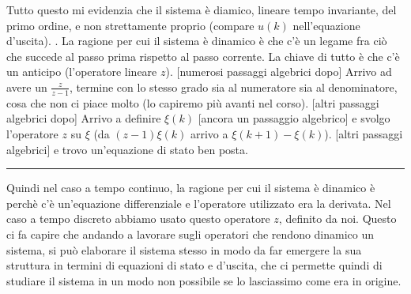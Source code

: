 Tutto questo mi evidenzia che il sistema è diamico, lineare tempo invariante, del primo ordine, e non strettamente proprio (compare $u(k)$ nell'equazione d'uscita).\newline
{}.\newline
\newline
La ragione per cui il sistema è dinamico è che c'è un legame fra ciò che succede al passo prima rispetto al passo corrente. La chiave di tutto è che c'è un anticipo (l'operatore lineare $z$). [numerosi passaggi algebrici dopo] Arrivo ad avere un $\frac{z}{z-1}$, termine con lo stesso grado sia al numeratore sia al denominatore, cosa che non ci piace molto (lo capiremo più avanti nel corso). [altri passaggi algebrici dopo] Arrivo a definire $\xi(k)$ [ancora un passaggio algebrico] e svolgo l'operatore $z$ su $\xi$ (da $(z-1)\xi(k)$ arrivo a $\xi(k+1) - \xi(k)$). [altri passaggi algebrici] e trovo un'equazione di stato ben posta.\newline
\rule{\textwidth}{0,4pt}\newline
\newline
Quindi nel caso a tempo continuo, la ragione per cui il sistema è dinamico è perchè c'è un'equazione differenziale e l'operatore utilizzato era la derivata. Nel caso a tempo discreto abbiamo usato questo operatore $z$, definito da noi.\newline
Questo ci fa capire che andando a lavorare sugli operatori che rendono dinamico un sistema, si può elaborare il sistema stesso in modo da far emergere la sua struttura in termini di equazioni di stato e d'uscita, che ci permette quindi di studiare il sistema in un modo non possibile se lo lasciassimo come era in origine.\newline
\newline
